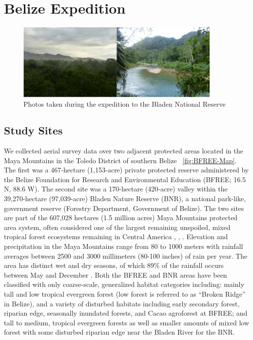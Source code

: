 
\chapter{Belize Expedition} %

\label{Chapter3}

\begin{figure}[ht]
\includegraphics[width=0.9\textwidth]{Figures/TripPhotos.png}
\caption{Photos taken during the expedition to the Bladen National Reserve}
\label{fig:TripPhotos}
\end{figure}

\section{Study Sites}

We collected aerial survey data over two adjacent protected areas located in the Maya Mountains in the Toledo District of southern Belize ~\ref{fig:BFREE-Map}. The first was a 467-hectare (1,153-acre) private protected reserve administered by the Belize Foundation for Research and Environmental Education (BFREE; 16.5 N, 88.6 W).  The second site was a 170-hectare (420-acre) valley within the 39,270-hectare (97,039-acre) Bladen Nature Reserve (BNR), a national park-like, government reserve (Forestry Department, Government of Belize).  The two sites are part of the 607,028 hectares (1.5 million acres) Maya Mountains protected area system, often considered one of the largest remaining unspoiled, mixed tropical forest ecosystems remaining in Central America \cite{Brewer}, \cite{Olivet}, \cite{Dourson}.  Elevation and precipitation in the Maya Mountains range from 80 to 1000 meters with rainfall averages between 2500 and 3000 millimeters (80-100 inches) of rain per year. The area has distinct wet and dry seasons, of which $89\%$ of the rainfall occurs between May and December \cite{Brokaw}.  Both the BFREE and BNR areas have been classified with only coarse-scale, generalized habitat categories including: mainly tall and low tropical evergreen forest (low forest is referred to as “Broken Ridge” in Belize), and a variety of disturbed habitats including early secondary forest, riparian edge, seasonally inundated forests, and Cacao agroforest at BFREE; and tall to medium, tropical evergreen forests as well as smaller amounts of mixed low forest with some disturbed riparian edge near the Bladen River for the BNR.

